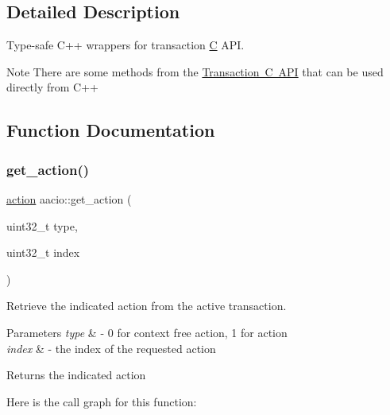 \subsection{Detailed Description}
Type-\/safe C++ wrappers for transaction \mbox{\hyperlink{struct_c}{C}} A\+PI. 

\begin{DoxyNote}{Note}
There are some methods from the \mbox{\hyperlink{group__transactioncapi}{Transaction C A\+PI}} that can be used directly from C++ 
\end{DoxyNote}


\subsection{Function Documentation}
\mbox{\label{group__transactioncppapi_ga974a97d5931de251ebd3dcf672dfca96}} 
\subsubsection{\texorpdfstring{get\+\_\+action()}{get\_action()}}
{\footnotesize\ttfamily \mbox{\hyperlink{structaacio_1_1action}{action}} aacio\+::get\+\_\+action (\begin{DoxyParamCaption}\item[{uint32\+\_\+t}]{type,  }\item[{uint32\+\_\+t}]{index }\end{DoxyParamCaption})\hspace{0.3cm}{\ttfamily [inline]}}

Retrieve the indicated action from the active transaction. 
\begin{DoxyParams}{Parameters}
{\em type} & -\/ 0 for context free action, 1 for action \\
\hline
{\em index} & -\/ the index of the requested action \\
\hline
\end{DoxyParams}
\begin{DoxyReturn}{Returns}
the indicated action 
\end{DoxyReturn}
Here is the call graph for this function\+:
